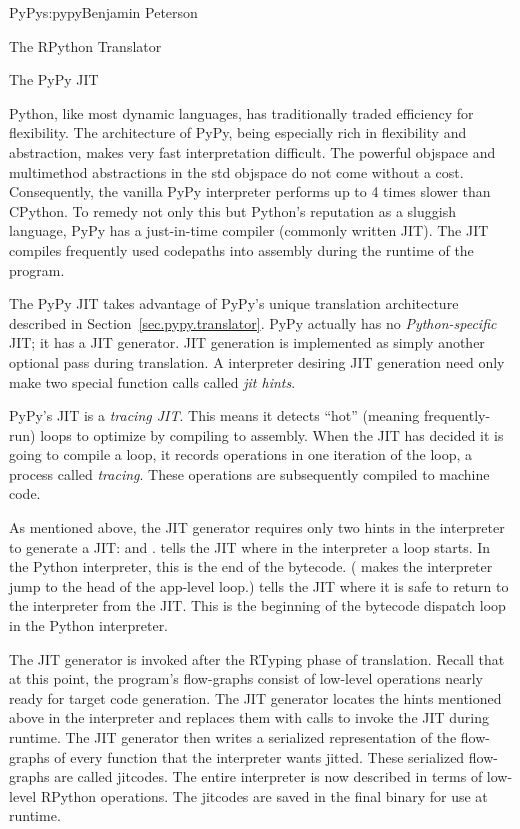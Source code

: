 \begin{aosachapter}{PyPy}{s:pypy}{Benjamin Peterson}
\begin{aosasect1}{The RPython Translator}
\end{aosasect1}

\begin{aosasect1}{The PyPy JIT}
\label{sec.pypy.jit}

Python, like most dynamic languages, has traditionally traded efficiency for
flexibility. The architecture of PyPy, being especially rich in flexibility and
abstraction, makes very fast interpretation difficult. The powerful objspace and
multimethod abstractions in the std objspace do not come without a
cost. Consequently, the vanilla PyPy interpreter performs up to 4 times slower
than CPython. To remedy not only this but Python's reputation as a sluggish
language, PyPy has a just-in-time compiler (commonly written JIT). The JIT
compiles frequently used codepaths into assembly during the runtime of the
program.

The PyPy JIT takes advantage of PyPy's unique translation architecture described in
Section~\ref{sec.pypy.translator}. PyPy actually has no \emph{Python-specific} JIT;
it has a JIT generator. JIT generation is implemented as simply another optional
pass during translation. A interpreter desiring JIT generation need only make
two special function calls called \emph{jit hints}.

PyPy's JIT is a \emph{tracing JIT}. This means it detects ``hot'' (meaning
frequently-run) loops to optimize by compiling to assembly. When the JIT has
decided it is going to compile a loop, it records operations in one iteration of
the loop, a process called \emph{tracing}. These operations are subsequently
compiled to machine code.

As mentioned above, the JIT generator requires only two hints in the interpreter
to generate a JIT:  and
.  tells the JIT where in the
interpreter a loop starts. In the Python interpreter, this is the end of the
 bytecode. ( makes the interpreter jump
to the head of the app-level loop.)  tells the JIT where it is
safe to return to the interpreter from the JIT. This is the beginning of the
bytecode dispatch loop in the Python interpreter.

The JIT generator is invoked after the RTyping phase of translation. Recall that
at this point, the program's flow-graphs consist of low-level operations nearly
ready for target code generation. The JIT generator locates the hints mentioned
above in the interpreter and replaces them with calls to invoke the JIT during
runtime. The JIT generator then writes a serialized representation of the
flow-graphs of every function that the interpreter wants jitted. These
serialized flow-graphs are called jitcodes. The entire interpreter is now
described in terms of low-level RPython operations. The jitcodes are saved in
the final binary for use at runtime.


\end{aosasect1}
\end{aosachapter}
